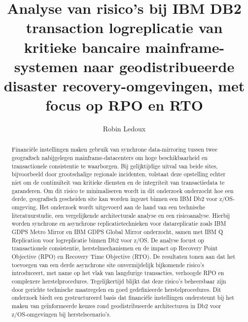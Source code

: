 \documentclass[a0,portrait]{hogent-poster}
\title{Analyse van risico's bij IBM DB2 transaction logreplicatie van kritieke bancaire mainframe-systemen naar geodistribueerde disaster recovery\--omge\-vingen, met focus op RPO en RTO}
\author{Robin Ledoux}
\begin{document}
\maketitle

\begin{abstract}
Financiële instellingen maken gebruik van synchrone data-mirroring tussen twee geografisch nabijgelegen mainframe-datacenters om hoge beschikbaarheid en transactionele consistentie te waarborgen.
Bij gelijktijdige uitval van beide sites, bijvoorbeeld door grootschalige regionale incidenten, volstaat deze opstelling echter niet om de continuïteit van kritieke diensten en de integriteit van transactiedata te garanderen.
Om dit risico te minimaliseren wordt in dit onderzoek onderzocht hoe een derde, geografisch gescheiden site kan worden ingezet binnen een IBM Db2 voor z/OS-omgeving.
Het onderzoek wordt uitgevoerd aan de hand van een technische literatuurstudie, een vergelijkende architecturale analyse en een risicoanalyse.
Hierbij worden synchrone en asynchrone replicatietechnieken voor datareplicatie zoals IBM GDPS Metro Mirror en IBM GDPS Global Mirror onderzocht, samen met IBM Q Replication voor logreplicatie binnen Db2 voor z/OS.
De analyse focust op transactionele consistentie, herstelmechanismen en de impact op Recovery Point Objective (RPO) en Recovery Time Objective (RTO).
De resultaten tonen aan dat het toevoegen van een derde asynchrone site onvermijdelijk bijkomende risico's introduceert, met name op het vlak van langdurige transacties, verhoogde RPO en complexere herstelprocedures.
Tegelijkertijd blijkt dat deze risico's beheersbaar zijn door gerichte technische maatregelen en goed gedefinieerde herstelprocedures.
Dit onderzoek biedt een gestructureerd basis dat financiële instellingen ondersteunt bij het maken van geïnformeerde keuzes rond geodistribueerde architecturen in Db2 voor z/OS-omgevingen bij herstelscenario's.
\end{abstract}
\end{document}
